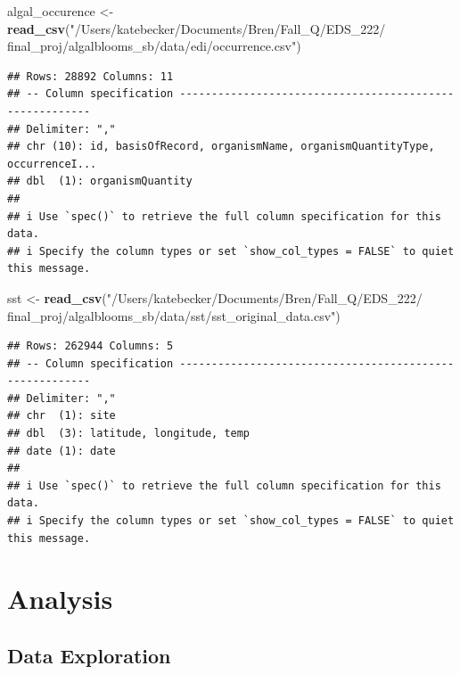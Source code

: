 \documentclass[
]{article}
\newenvironment{Shaded}{\begin{snugshade}}{\end{snugshade}}
\newcommand{\FunctionTok}[1]{\textcolor[rgb]{0.13,0.29,0.53}{\textbf{#1}}}
\newcommand{\NormalTok}[1]{#1}
\newcommand{\OtherTok}[1]{\textcolor[rgb]{0.56,0.35,0.01}{#1}}
\newcommand{\StringTok}[1]{\textcolor[rgb]{0.31,0.60,0.02}{#1}}
\begin{document}
\begin{Shaded}
\begin{Highlighting}[]
\NormalTok{algal\_occurence }\OtherTok{\textless{}{-}} \FunctionTok{read\_csv}\NormalTok{(}\StringTok{"/Users/katebecker/Documents/Bren/Fall\_Q/EDS\_222/ final\_proj/algalblooms\_sb/data/edi/occurrence.csv"}\NormalTok{)}
\end{Highlighting}
\end{Shaded}

\begin{verbatim}
## Rows: 28892 Columns: 11
## -- Column specification --------------------------------------------------------
## Delimiter: ","
## chr (10): id, basisOfRecord, organismName, organismQuantityType, occurrenceI...
## dbl  (1): organismQuantity
## 
## i Use `spec()` to retrieve the full column specification for this data.
## i Specify the column types or set `show_col_types = FALSE` to quiet this message.
\end{verbatim}

\begin{Shaded}
\begin{Highlighting}[]
\NormalTok{sst }\OtherTok{\textless{}{-}} \FunctionTok{read\_csv}\NormalTok{(}\StringTok{"/Users/katebecker/Documents/Bren/Fall\_Q/EDS\_222/ final\_proj/algalblooms\_sb/data/sst/sst\_original\_data.csv"}\NormalTok{)}
\end{Highlighting}
\end{Shaded}

\begin{verbatim}
## Rows: 262944 Columns: 5
## -- Column specification --------------------------------------------------------
## Delimiter: ","
## chr  (1): site
## dbl  (3): latitude, longitude, temp
## date (1): date
## 
## i Use `spec()` to retrieve the full column specification for this data.
## i Specify the column types or set `show_col_types = FALSE` to quiet this message.
\end{verbatim}

\hypertarget{analysis}{%
\section{Analysis}\label{analysis}}

\hypertarget{data-exploration}{%
\subsection{Data Exploration}\label{data-exploration}}
\end{document}
